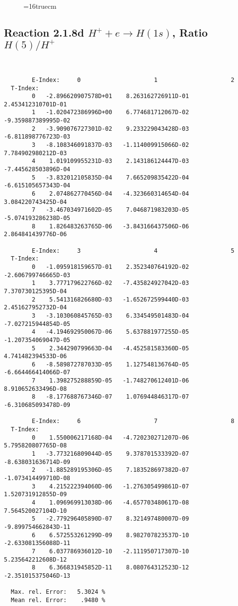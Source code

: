 \documentclass[12pt,dvipdfmx]{article}
\begin{document}
\begin{figure} \label{2.1.8rc}
\epsfxsize=16truecm
\end{figure}
\newpage



\subsection{
Reaction 2.1.8d  $H^+ + e \rightarrow H(1s) $,  Ratio $H(5)/H^+$
}

\begin{small}\begin{verbatim}


        E-Index:     0                     1                     2
  T-Index:
        0   -2.896620907578D+01    8.263162726911D-01    2.453412310701D-01
        1   -1.020472386996D+00    6.774681712067D-02   -9.359887389995D-02
        2   -3.909076727301D-02    9.233229043428D-03   -6.811898776723D-03
        3   -8.108346091837D-03   -1.114009915066D-02    7.784902980212D-03
        4    1.019109955231D-03    2.143186124447D-03   -7.445628503896D-04
        5   -3.832012105835D-04    7.665209835422D-04   -6.615105657343D-04
        6    2.074862770456D-04   -4.323660314654D-04    3.084220743425D-04
        7   -3.467034971602D-05    7.046871983203D-05   -5.074193286238D-05
        8    1.826483263765D-06   -3.843166437506D-06    2.864841439776D-06

        E-Index:     3                     4                     5
  T-Index:
        0   -1.095918159657D-01    2.352340764192D-02   -2.606799746665D-03
        1    3.777179622766D-02   -7.435824927042D-03    7.370730125395D-04
        2    5.541316826680D-03   -1.652672599440D-03    2.451627952732D-04
        3   -3.103060845765D-03    6.334549501483D-04   -7.027215944854D-05
        4   -4.194692950067D-06    5.637881977255D-05   -1.207354069047D-05
        5    2.344290799663D-04   -4.452581583360D-05    4.741482394533D-06
        6   -8.589872787033D-05    1.127548136764D-05   -6.664466414066D-07
        7    1.398275288859D-05   -1.748270612401D-06    8.910652633496D-08
        8   -8.177688767346D-07    1.076944846317D-07   -6.310685093478D-09

        E-Index:     6                     7                     8
  T-Index:
        0    1.550006217168D-04   -4.720230271207D-06    5.795820807765D-08
        1   -3.773216809044D-05    9.378701533392D-07   -8.638031636714D-09
        2   -1.885289195306D-05    7.183528697382D-07   -1.073414499710D-08
        3    4.215222394060D-06   -1.276305499861D-07    1.520731912855D-09
        4    1.096969913038D-06   -4.657703480617D-08    7.564520027104D-10
        5   -2.779296405890D-07    8.321497480007D-09   -9.899754662843D-11
        6    6.572553261299D-09    8.982707823537D-10   -2.633081356088D-11
        7    6.037786936012D-10   -2.111950717307D-10    5.235642212608D-12
        8    6.366831945852D-11    8.080764312523D-12   -2.351015375046D-13

  Max. rel. Error:   5.3024 %
  Mean rel. Error:    .9480 %


\end{verbatim}\end{small}
\end{document}
